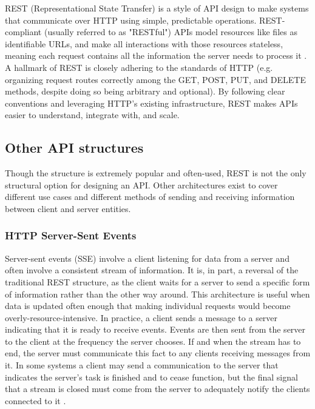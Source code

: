 REST (Representational State Transfer) is a style of API design to make systems that communicate over HTTP using simple, predictable operations. REST-compliant (usually referred to as "RESTful") APIs model resources like files as identifiable URLs, and make all interactions with those resources stateless, meaning each request contains all the information the server needs to process it \cite{lauret_design_2025}. A hallmark of REST is closely adhering to the standards of HTTP (e.g. organizing request routes correctly among the GET, POST, PUT, and DELETE methods, despite doing so being arbitrary and optional). By following clear conventions and leveraging HTTP's existing infrastructure, REST makes APIs easier to understand, integrate with, and scale.

\subsection{Other API structures}

Though the structure is extremely popular and often-used, REST is not the only structural option for designing an API. Other architectures exist to cover different use cases and different methods of sending and receiving information between client and server entities.

\subsubsection{HTTP Server-Sent Events}

Server-sent events (SSE) involve a client listening for data from a server and often involve a consistent stream of information. It is, in part, a reversal of the traditional REST structure, as the client waits for a server to send a specific form of information rather than the other way around. This architecture is useful when data is updated often enough that making individual requests would become overly-resource-intensive. In practice, a client sends a message to a server indicating that it is ready to receive events. Events are then sent from the server to the client at the frequency the server chooses. If and when the stream has to end, the server must communicate this fact to any clients receiving messages from it. In some systems a client may send a communication to the server that indicates the server's task is finished and to cease function, but the final signal that a stream is closed must come from the server to adequately notify the clients connected to it \cite{noauthor_using_2025}.

